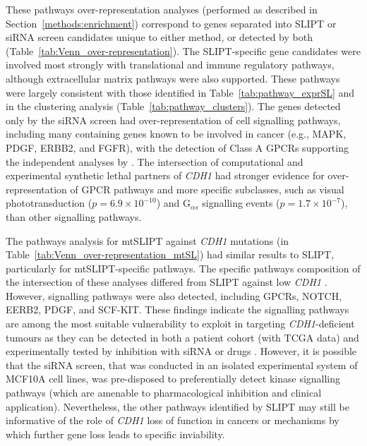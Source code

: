 These \glspl{pathway} over-representation analyses (performed as described in Section~\ref{methods:enrichment}) correspond to genes separated into \gls{SLIPT} or \gls{siRNA} screen candidates unique to either method, or detected by both (Table~\ref{tab:Venn_over-representation}). The \gls{SLIPT}-specific gene candidates were involved most strongly with translational and immune regulatory \glspl{pathway}, although extracellular matrix \glspl{pathway} were also supported. These \glspl{pathway} were largely consistent with those identified in Table~\ref{tab:pathway_exprSL} and in the clustering analysis (Table~\ref{tab:pathway_clusters}). The genes detected only by the \gls{siRNA} screen had over-represent\-ation of cell signalling \glspl{pathway}, including many containing genes known to be involved in cancer (e.g., MAPK, PDGF, ERBB2, and FGFR), with the detection of Class A GPCRs supporting the independent analyses by \citet{Telford2015}. The intersection of computational and experimental \gls{synthetic lethal} partners of \textit{CDH1} had stronger evidence for over-represent\-ation of \gls{GPCR} \glspl{pathway} and more specific subclasses, such as visual phototransduction ($p=6.9 \times 10^{-10}$) and G$_{\alpha s}$ signalling events ($p=1.7 \times 10^{-7}$), than other signalling \glspl{pathway}.

The \glspl{pathway} analysis for \acrshort{mtSLIPT} against \textit{CDH1} \glspl{mutation} (in Table~\ref{tab:Venn_over-representation_mtSL}) had similar results to \gls{SLIPT}, particularly for \acrshort{mtSLIPT}-specific  \glspl{pathway}. The specific \glspl{pathway} composition of the intersection of these analyses differed from \gls{SLIPT} against low \textit{CDH1} . However, signalling \glspl{pathway} were also detected, including \glspl{GPCR}, NOTCH, EERB2, PDGF, and SCF-KIT. These findings indicate the signalling \glspl{pathway} are among the most suitable vulnerability to exploit in targeting \textit{CDH1}-deficient tumours as they can be detected in both a patient cohort (with \gls{TCGA}  data) and experimentally tested by inhibition with \gls{siRNA} or drugs \citep{Telford2015}. However, it is possible that the \gls{siRNA} screen, that was conducted in an isolated experimental system of MCF10A cell lines, was pre-disposed to preferentially detect kinase signalling \glspl{pathway} (which are amenable to pharmacological inhibition and clinical application). Nevertheless, the other \glspl{pathway} identified by \gls{SLIPT} may still be informative of the role of \textit{CDH1} loss of function in cancers or mechanisms by which further gene loss leads to specific inviability.


